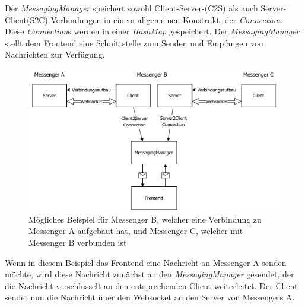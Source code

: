 \documentclass[a4paper,ngerman, headheight=28pt,12pt]{scrartcl}
\begin{document}
Der \textit{MessagingManager} speichert sowohl Client-Server-(C2S) als auch Server-Client(S2C)-Verbindungen in einem allgemeinen Konstrukt, der \textit{Connection}. Diese \textit{Connection}s werden in einer \textit{HashMap} gespeichert. Der \textit{MessagingManager} stellt dem Frontend eine Schnittstelle zum Senden und Empfangen von Nachrichten zur Verfügung.
\begin{figure}[h]
  \centering
  \includegraphics[width=\textwidth]{diagrams/messaging_messenger.pdf}
  \caption{Mögliches Beispiel für Messenger B, welcher eine Verbindung zu Messenger A aufgebaut hat, und Messenger C, welcher mit Messenger B verbunden ist \label{fig:MessagingMessenger}}
\end{figure}
Wenn in diesem Beispiel das Frontend eine Nachricht an Messenger A senden möchte, wird diese Nachricht zunächst an den \textit{MessagingManager} gesendet, der die Nachricht verschlüsselt an den entsprechenden Client weiterleitet. Der Client sendet nun die Nachricht über den Websocket an den Server von Messengers A.
\end{document}
